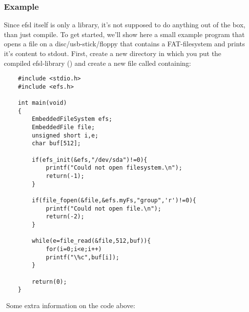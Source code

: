 \subsubsection{Example}
Since efsl itself is only a library, it's not supposed to do anything
out of the box, than just compile. To get started, we'll show here a small
example program that opens a file on a disc/usb-stick/floppy that contains
a FAT-filesystem and prints it's content to stdout.\newline
\newline
First, create a new directory in which you put the compiled efsl-library
() and create a new file called  containing:
\lstset{numbers=left, stepnumber=1, numberstyle=\small, numbersep=5pt, tabsize=4}
\begin{lstlisting}
	#include <stdio.h>
	#include <efs.h>

	int main(void)
	{
		EmbeddedFileSystem efs;
		EmbeddedFile file;
		unsigned short i,e;
		char buf[512];

		if(efs_init(&efs,"/dev/sda")!=0){
			printf("Could not open filesystem.\n");
			return(-1);
		}

		if(file_fopen(&file,&efs.myFs,"group",'r')!=0){
			printf("Could not open file.\n");
			return(-2);
		}

		while(e=file_read(&file,512,buf)){
			for(i=0;i<e;i++)
			printf("\%c",buf[i]);
		}

		return(0);
	}
\end{lstlisting}
$ $\newline
Some extra information on the code above:
